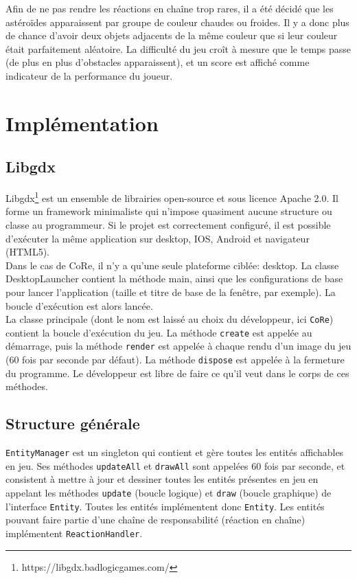 \documentclass[11pt,a4paper,twoside,svgnames]{article}
\begin{document}
Afin de ne pas rendre les réactions en chaîne trop rares, il a été décidé que les astéroïdes apparaissent par groupe de couleur chaudes ou froides. Il y a donc plus de chance d'avoir deux objets adjacents de la même couleur que si leur couleur était parfaitement aléatoire. La difficulté du jeu croît à mesure que le temps passe (de plus en plus d'obstacles apparaissent), et un score est affiché comme indicateur de la performance du joueur.

\clearpage

\section{Implémentation}
\subsection{Libgdx}
Libgdx\footnote{https://libgdx.badlogicgames.com/} est un ensemble de librairies open-source et sous licence Apache 2.0. Il forme un framework minimaliste qui n'impose quasiment aucune structure ou classe au programmeur. Si le projet est correctement configuré, il est possible d'exécuter la même application sur desktop, IOS, Android et navigateur (HTML5).\\

Dans le cas de CoRe, il n'y a qu'une seule plateforme ciblée: desktop. La classe DesktopLauncher contient la méthode main, ainsi que les configurations de base pour lancer l'application (taille et titre de base de la fenêtre, par exemple). La boucle d'exécution est alors lancée.\\

La classe principale (dont le nom est laissé au choix du développeur, ici \texttt{CoRe}) contient la boucle d'exécution du jeu. La méthode \texttt{create} est appelée au démarrage, puis la méthode \texttt{render} est appelée à chaque rendu d'un image du jeu (60 fois par seconde par défaut). La méthode \texttt{dispose} est appelée à la fermeture du programme. Le développeur est libre de faire ce qu'il veut dans le corps de ces méthodes.

\subsection{Structure générale}
\texttt{EntityManager} est un singleton qui contient et gère toutes les entités affichables en jeu. Ses méthodes \texttt{updateAll} et \texttt{drawAll} sont appelées 60 fois par seconde, et consistent à mettre à jour et dessiner toutes les entités présentes en jeu en appelant les méthodes \texttt{update} (boucle logique) et \texttt{draw} (boucle graphique) de l'interface \texttt{Entity}. Toutes les entités implémentent donc \texttt{Entity}. Les entités pouvant faire partie d'une chaîne de responsabilité (réaction en chaîne) implémentent \texttt{ReactionHandler}.\\
\end{document}
